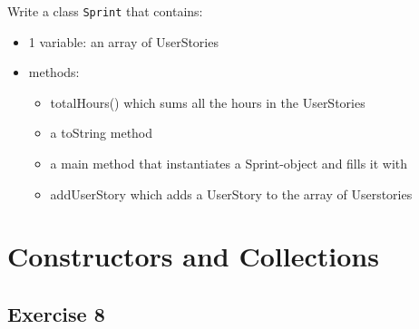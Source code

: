 Write a class \texttt{Sprint} that contains:
                 \begin{itemize}
                    \item 1 variable: an array of UserStories
                    \item methods:
                    \begin{itemize}
                        \item totalHours() which sums all the hours in the UserStories
                        \item a toString method
                        \item a main method that instantiates a Sprint-object and fills it with
                        \item addUserStory which adds a UserStory to the array of Userstories
                \end{itemize}
            \end{itemize}

    \section{Constructors and Collections}
\subsection{Exercise 8}

